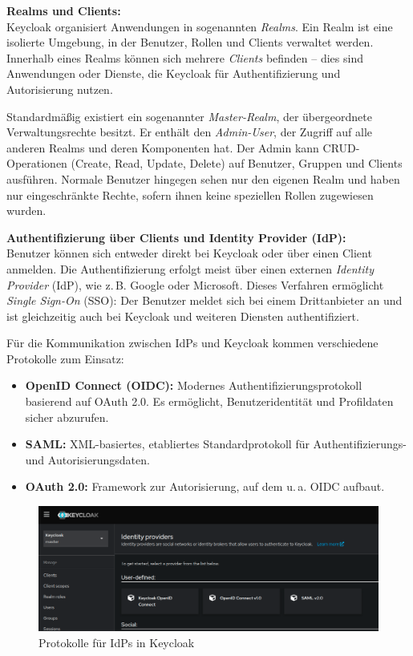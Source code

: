 \documentclass[a4paper,12pt]{article}
\begin{document}
	\vspace{0.5em}
	\textbf{Realms und Clients:}\\
	Keycloak organisiert Anwendungen in sogenannten \textit{Realms}. Ein Realm ist eine isolierte Umgebung, in der Benutzer, Rollen und Clients verwaltet werden. Innerhalb eines Realms können sich mehrere \textit{Clients} befinden – dies sind Anwendungen oder Dienste, die Keycloak für Authentifizierung und Autorisierung nutzen.
	
	Standardmäßig existiert ein sogenannter \textit{Master-Realm}, der übergeordnete Verwaltungsrechte besitzt. Er enthält den \textit{Admin-User}, der Zugriff auf alle anderen Realms und deren Komponenten hat. Der Admin kann CRUD-Operationen (Create, Read, Update, Delete) auf Benutzer, Gruppen und Clients ausführen. Normale Benutzer hingegen sehen nur den eigenen Realm und haben nur eingeschränkte Rechte, sofern ihnen keine speziellen Rollen zugewiesen wurden.
	
	\vspace{0.5em}
	\textbf{Authentifizierung über Clients und Identity Provider (IdP):}\\
	Benutzer können sich entweder direkt bei Keycloak oder über einen Client anmelden. Die Authentifizierung erfolgt meist über einen externen \textit{Identity Provider} (IdP), wie z.\,B. Google oder Microsoft. Dieses Verfahren ermöglicht \textit{Single Sign-On} (SSO): Der Benutzer meldet sich bei einem Drittanbieter an und ist gleichzeitig auch bei Keycloak und weiteren Diensten authentifiziert.
	
	Für die Kommunikation zwischen IdPs und Keycloak kommen verschiedene Protokolle zum Einsatz:
	\begin{itemize}
		\item \textbf{OpenID Connect (OIDC):} Modernes Authentifizierungsprotokoll basierend auf OAuth 2.0. Es ermöglicht, Benutzeridentität und Profildaten sicher abzurufen.
		\item \textbf{SAML:} XML-basiertes, etabliertes Standardprotokoll für Authentifizierungs- und Autorisierungsdaten.
		\item \textbf{OAuth 2.0:} Framework zur Autorisierung, auf dem u.\,a. OIDC aufbaut.
	\end{itemize}
	
	\begin{figure}[H]
		\centering
		\includegraphics[width=0.9\linewidth]{screenshot007}
		\caption{Protokolle für IdPs in Keycloak}
		\label{fig:screenshot007}
	\end{figure}
	
\end{document}
